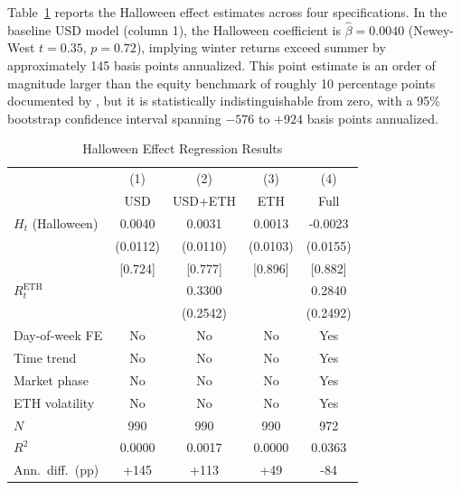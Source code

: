 \documentclass[12pt,a4paper]{article}
\begin{document}
Table~\ref{tab:main_results} reports the Halloween effect estimates across four specifications. In the baseline USD model (column 1), the Halloween coefficient is $\hat{\beta} = 0.0040$ (Newey-West $t = 0.35$, $p = 0.72$), implying winter returns exceed summer by approximately 145 basis points annualized. This point estimate is an order of magnitude larger than the equity benchmark of roughly 10 percentage points documented by \citet{BoumanJacobsen2002}, but it is statistically indistinguishable from zero, with a 95\% bootstrap confidence interval spanning $-576$ to $+924$ basis points annualized.

\begin{table}[htbp]
\centering
\begin{threeparttable}
\caption{Halloween Effect Regression Results}
\label{tab:main_results}

\begin{tabular*}{\textwidth}{@{\extracolsep{\fill}} lcccc}
\toprule
& (1) & (2) & (3) & (4) \\
& USD & USD+ETH & ETH & Full \\
\midrule
$H_t$ (Halloween) & 0.0040 & 0.0031 & 0.0013 & -0.0023 \\
                  & (0.0112) & (0.0110) & (0.0103) & (0.0155) \\
                  & [0.724] & [0.777] & [0.896] & [0.882] \\

\addlinespace
$R_t^{\mathrm{ETH}}$ &        & 0.3300 &        & 0.2840 \\
                     &        & (0.2542) &      & (0.2492) \\

\addlinespace
Day-of-week FE    & No  & No  & No  & Yes \\
Time trend        & No  & No  & No  & Yes \\
Market phase      & No  & No  & No  & Yes \\
ETH volatility    & No  & No  & No  & Yes \\

\addlinespace
$N$               & 990    & 990    & 990    & 972 \\
$R^2$             & 0.0000 & 0.0017 & 0.0000 & 0.0363 \\
Ann.\ diff.\ (pp) & +145   & +113   & +49    & -84 \\
\bottomrule
\end{tabular*}


\end{threeparttable}
\end{table}
\end{document}
